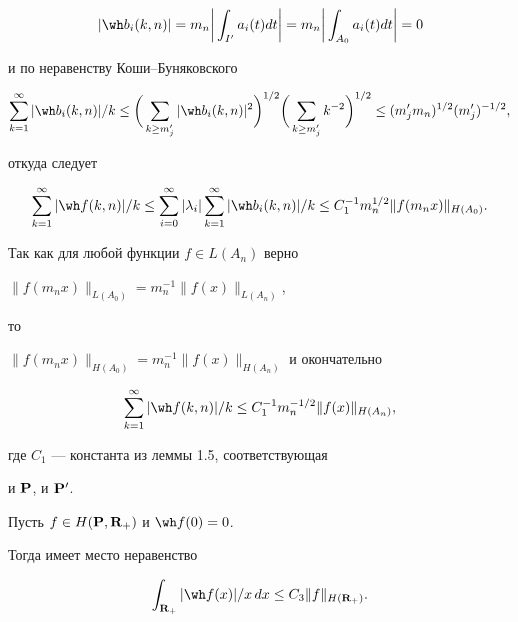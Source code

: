 \begin{pf}
$$


|{\wh b}_i(k,n)|=m_n\bigg|\int_{I'}a_i(t)dt\bigg|=


m_n\bigg|\int_{A_0}a_i(t)dt\bigg|=0


$$


и по неравенству Коши--Буняковского


$$


\sum_{k=1}^{\infty}|{\wh b}_i(k,n)|/k\leq


\bigg(\sum_{k\geq m'_j}|{\wh b}_i(k,n)|^2\bigg)^{1/2}


\bigg(\sum_{k\geq m'_j}k^{-2}\bigg)^{1/2}\le 


(m'_jm_n)^{1/2}(m'_j)^{-1/2},


$$


откуда следует


$$


\sum^{\infty}_{k=1}|{\wh f}(k,n)|/k\leq


\sum^{\infty}_{i=0}|\lambda_i|\sum_{k=1}^{\infty}|{\wh b}_i(k,n)|/k


\leq C_1^{-1}m_n^{1/2}\|f(m_nx)\|_{H(A_0)}.


$$


Так как для любой функции $f\in L(A_n)$ верно


$\|f(m_nx)\|_{L(A_0)}=m_n^{-1}\|f(x)\|_{L(A_n)}$,


то


$\|f(m_nx)\|_{H(A_0)}=m_n^{-1}\|f(x)\|_{H(A_n)}$ и окончательно


$$


\sum^{\infty}_{k=1}|{\wh f}(k,n)|/k\leq C_1^{-1}m_n^{-1/2}\|f(x)\|_{H(A_n)},


$$


где $C_1$ --- константа из леммы 1.5, соответствующая


и ${\bold P}$, и ${\bold P}'$. 


\end{pf}








\begin{thms}


Пусть $f\in H({\bold P},{\bold R}_+)$ и ${\wh f}(0)=0$.


Тогда имеет место неравенство


$$


\int_{{\bold R}_+}|{\wh f}(x)|/x\,dx\leq C_3\|f\|_{H({\bold R}_+)}.


$$


\end{thms}








